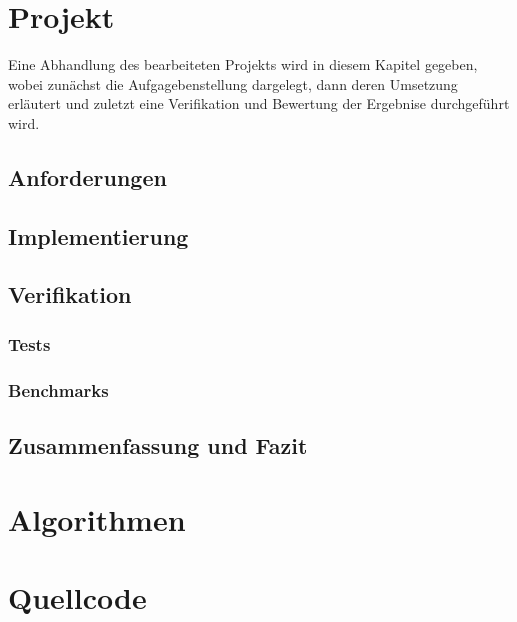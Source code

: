 \documentclass[a4paper,12pt,oneside,german,toc=bibliography]{scrbook}
\theoremstyle{definition}
\theoremstyle{plain}
\numberwithin{equation}{section}
\begin{document}
\chapter{Projekt}
Eine Abhandlung des bearbeiteten Projekts wird in diesem Kapitel gegeben,
wobei zunächst die Aufgagebenstellung dargelegt, dann deren Umsetzung erläutert
und zuletzt eine Verifikation und Bewertung der Ergebnise durchgeführt wird.


\section{Anforderungen}


\section{Implementierung}


\section{Verifikation}
    \subsection{Tests}     
    \subsection{Benchmarks}


\section{Zusammenfassung und Fazit}




\appendix


\chapter{Algorithmen}


\chapter{Quellcode}





\end{document}
